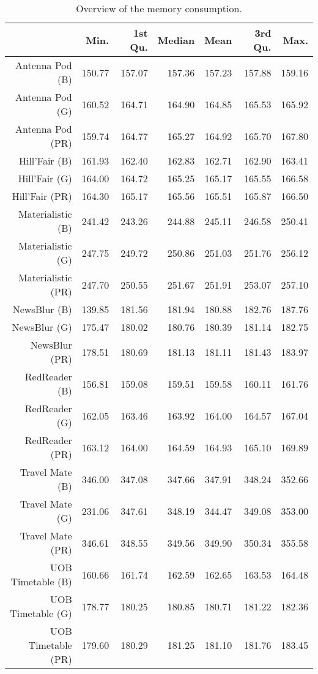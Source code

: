 \begin{table}[ht]
\centering
\begin{tabular}{rrrrrrr}
  \hline
 & Min. & 1st Qu. & Median & Mean & 3rd Qu. & Max. \\ 
  \hline
Antenna Pod (B) & 150.77 & 157.07 & 157.36 & 157.23 & 157.88 & 159.16 \\ 
  Antenna Pod (G) & 160.52 & 164.71 & 164.90 & 164.85 & 165.53 & 165.92 \\ 
  Antenna Pod (PR) & 159.74 & 164.77 & 165.27 & 164.92 & 165.70 & 167.80 \\ 
  Hill'Fair (B) & 161.93 & 162.40 & 162.83 & 162.71 & 162.90 & 163.41 \\ 
  Hill'Fair (G) & 164.00 & 164.72 & 165.25 & 165.17 & 165.55 & 166.58 \\ 
  Hill'Fair (PR) & 164.30 & 165.17 & 165.56 & 165.51 & 165.87 & 166.50 \\ 
  Materialistic (B) & 241.42 & 243.26 & 244.88 & 245.11 & 246.58 & 250.41 \\ 
  Materialistic (G) & 247.75 & 249.72 & 250.86 & 251.03 & 251.76 & 256.12 \\ 
  Materialistic (PR) & 247.70 & 250.55 & 251.67 & 251.91 & 253.07 & 257.10 \\ 
  NewsBlur (B) & 139.85 & 181.56 & 181.94 & 180.88 & 182.76 & 187.76 \\ 
  NewsBlur (G) & 175.47 & 180.02 & 180.76 & 180.39 & 181.14 & 182.75 \\ 
  NewsBlur (PR) & 178.51 & 180.69 & 181.13 & 181.11 & 181.43 & 183.97 \\ 
  RedReader (B) & 156.81 & 159.08 & 159.51 & 159.58 & 160.11 & 161.76 \\ 
  RedReader (G) & 162.05 & 163.46 & 163.92 & 164.00 & 164.57 & 167.04 \\ 
  RedReader (PR) & 163.12 & 164.00 & 164.59 & 164.93 & 165.10 & 169.89 \\ 
  Travel Mate (B) & 346.00 & 347.08 & 347.66 & 347.91 & 348.24 & 352.66 \\ 
  Travel Mate (G) & 231.06 & 347.61 & 348.19 & 344.47 & 349.08 & 353.00 \\ 
  Travel Mate (PR) & 346.61 & 348.55 & 349.56 & 349.90 & 350.34 & 355.58 \\ 
  UOB Timetable (B) & 160.66 & 161.74 & 162.59 & 162.65 & 163.53 & 164.48 \\ 
  UOB Timetable (G) & 178.77 & 180.25 & 180.85 & 180.71 & 181.22 & 182.36 \\ 
  UOB Timetable (PR) & 179.60 & 180.29 & 181.25 & 181.10 & 181.76 & 183.45 \\ 
   \hline
\end{tabular}
\caption{Overview of the memory consumption.} 
\label{tab:results:rq1:summary:memory}
\end{table}
